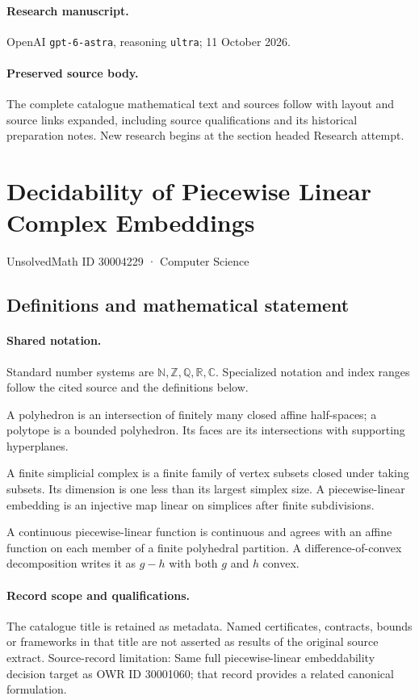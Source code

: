 \documentclass[11pt]{article}
\begin{document}
\paragraph{Research manuscript.} OpenAI \texttt{gpt-6-astra}, reasoning \texttt{ultra}; 11 October 2026.
\paragraph{Preserved source body.} The complete catalogue mathematical text and sources follow with layout and source links expanded, including source qualifications and its historical preparation notes. New research begins at the section headed Research attempt.

\section{Decidability of Piecewise Linear Complex Embeddings}\label{30004229}
{\small UnsolvedMath ID 30004229 · Computer Science}
\subsection{Definitions and mathematical statement}

\paragraph{Shared notation.}Standard number systems are $\mathbb N,\mathbb Z,\mathbb Q,\mathbb R,\mathbb C$. Specialized notation and index ranges follow the cited source and the definitions below.


A polyhedron is an intersection of finitely many closed affine half-spaces; a polytope is a bounded polyhedron. Its faces are its intersections with supporting hyperplanes.

A finite simplicial complex is a finite family of vertex subsets closed under taking subsets. Its dimension is one less than its largest simplex size. A piecewise-linear embedding is an injective map linear on simplices after finite subdivisions.

A continuous piecewise-linear function is continuous and agrees with an affine function on each member of a finite polyhedral partition. A difference-of-convex decomposition writes it as $g-h$ with both $g$ and $h$ convex.
\paragraph{Record scope and qualifications.}
The catalogue title is retained as metadata. Named certificates, contracts, bounds or frameworks in that title are not asserted as results of the original source extract.
Source-record limitation: Same full piecewise-linear embeddability decision target as OWR ID 30001060; that record provides a related canonical formulation.
\end{document}
